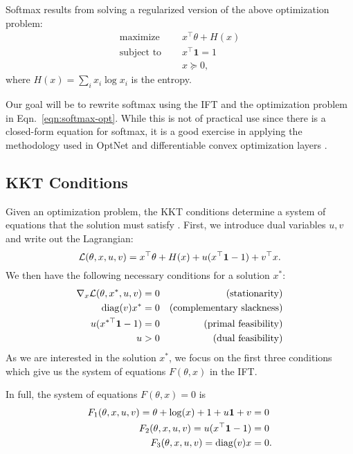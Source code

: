 \documentclass[11pt]{article}
\begin{document}
Softmax results from solving a regularized version of the above optimization problem:
\begin{equation}
\label{eqn:softmax-opt}
\begin{aligned}
\textrm{maximize } \quad & x^\top\theta + H(x)\\
\textrm{subject to } \quad & x^\top \mathbf{1} = 1\\
& x \succeq 0,
\end{aligned}
\end{equation}
where $H(x) = \sum_i x_i \log x_i$ is the entropy.

Our goal will be to rewrite softmax using the IFT and the optimization problem in
Eqn.~\ref{eqn:softmax-opt}.
While this is not of practical use since there is a closed-form equation
for softmax, it is a good exercise in applying the methodology
used in OptNet and differentiable convex optimization layers \citep{optnet,agrawal2019diffcvx}.

\subsection{KKT Conditions}
Given an optimization problem, the KKT conditions determine a system of equations
that the solution must satisfy \citep{kkt-thesis,kkt}.
First, we introduce dual variables $u,v$ and write out the Lagrangian:
$$\mathcal{L}(\theta, x, u, v) = x^\top\theta + H(x) + u(x^\top \mathbf{1} - 1) + v^\top x.$$
We then have the following necessary conditions for a solution $x^*$:
\begin{equation}
\begin{aligned}
\nabla_x \mathcal{L}(\theta, x^*,u,v) = 0 && \textrm{(stationarity)}\\
\mathrm{diag}(v)x^* = 0 && \textrm{(complementary slackness)}\\
u(x^{*\top} \mathbf{1} - 1) = 0 && \textrm{(primal feasibility)}\\
u > 0 && \textrm{(dual feasibility)}
\end{aligned}
\end{equation}
As we are interested in the solution $x^*$, we focus on the first three conditions
which give us the system of equations $F(\theta, x)$ in the IFT.

In full, the system of equations $F(\theta, x) = 0$ is
\begin{equation}
\label{eqn:system}
\begin{aligned}
F_1(\theta,x,u,v) = \theta + \log(x) + 1 + u\mathbf{1} + v &= 0\\
F_2(\theta,x,u,v) = u(x^{\top} \mathbf{1} - 1) &= 0\\
F_3(\theta,x,u,v) = \mathrm{diag}(v)x &= 0.
\end{aligned}
\end{equation}
\end{document}
